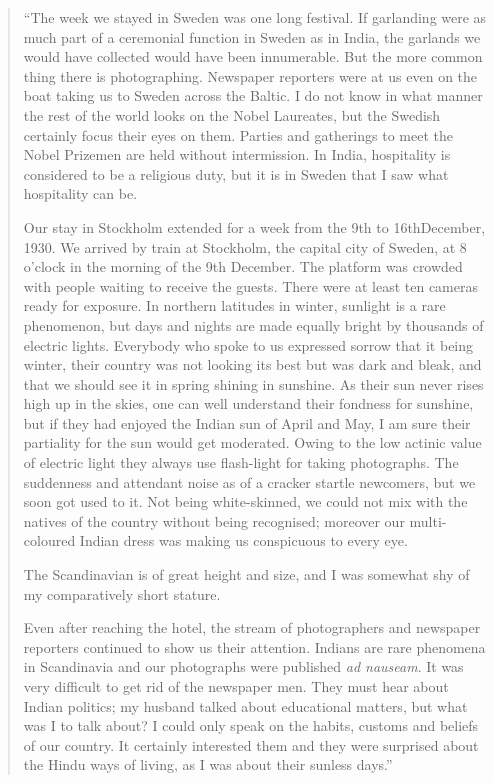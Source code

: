 \begin{quote}
{\fontsize{10pt}{12pt}\selectfont
``The week we stayed in Sweden was one long festival.
If garlanding were as much part of a ceremonial function in
Sweden as in India, the garlands we would have collected would
have been innumerable. But the more common thing there is
photographing. Newspaper reporters were at us even on the boat
taking us to Sweden across the Baltic. I do not know in what
manner the rest of the world looks on the Nobel Laureates, but
the Swedish certainly focus their eyes on them. Parties and
gatherings to meet the Nobel Prizemen are held without
intermission. In India, hospitality is considered to be a religious
duty, but it is in Sweden that I saw what hospitality can be.

Our stay in Stockholm extended for a week from the 9th to
16th\break December, 1930. We arrived by train at Stockholm, the
capital city of Sweden, at 8 o'clock in the morning of the 9th
December. The platform was crowded with people waiting to
receive the guests. There were at least ten cameras ready for
exposure. In northern latitudes in winter, sunlight is a rare
phenomenon, but days and nights are made equally bright by
thousands of electric lights. Everybody who spoke to us expressed
sorrow that it being winter, their country was not looking its best
but was dark and bleak, and that we should see it in spring shining
in sunshine. As their sun never rises high up in the skies, one can
well understand their fondness for sunshine, but if they had
enjoyed the Indian sun of April and May, I am sure their partiality
for the sun would get moderated. Owing to the low actinic value
of electric light they always use flash-light for taking photographs.
The suddenness and attendant noise as of a cracker startle newcomers, 
but we soon got used to it. Not being white-skinned, we
could not mix with the natives of the country without being
recognised; moreover our multi-coloured Indian dress was making
us conspicuous to every eye.

The Scandinavian is of great height and size, and I was
somewhat shy of my comparatively short stature.

Even after reaching the hotel, the stream of photographers
and newspaper reporters continued to show us their attention.
Indians are rare phenomena in Scandinavia and our photographs
were published {\em ad nauseam}. It was very difficult to get rid of the
newspaper men. They must hear about Indian politics; my
husband talked about educational matters, but what was I to talk about? 
I could only speak on the habits, customs and beliefs
of our country. It certainly interested them and they were surprised
about the Hindu ways of living, as I was about their sunless days.''
}\relax
\end{quote}

